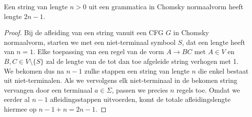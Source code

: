\documentclass[../aanvullingen_cursus.tex]{subfiles}
\begin{document}
\begin{stelling}
	Een string van lengte \(n>0\) uit een grammatica in Chomsky normaalvorm heeft lengte \(2n-1\).
\end{stelling}


\begin{proof}

	Bij de afleiding van een string vanuit een CFG \(G\) in Chomsky normaalvorm, starten we met een niet-terminaal symbool \(S\), dat een lengte heeft van \(n=1\). Elke toepassing van een regel van de vorm \(A\to BC\) met \(A \in V\) en \(B,C \in V \setminus \{S\}\) zal de lengte van de tot dan toe afgeleide string verhogen met 1. We bekomen dus na \(n-1\) zulke stappen een string van lengte \(n\) die enkel bestaat uit niet-terminalen. Als we vervolgens elk niet-terminaal in de bekomen string vervangen door een terminaal \(a\in \Sigma\), passen we precies \(n\) regels toe. Omdat we eerder al \(n-1\) afleidingsstappen uitvoerden, komt de totale afleidingslengte hiermee op \(n-1+n=2n-1\).
\end{proof}
\end{document}
